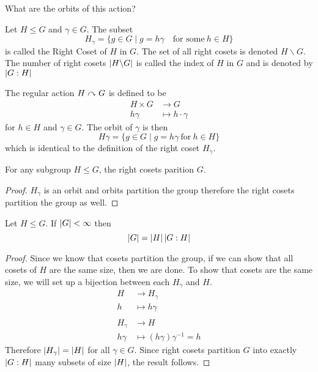 \documentclass{article}
\begin{document}
What are the orbits of this action?

\begin{defi}
    Let $H \leq G$ and $\gamma \in G$. The subset
    \[
        H_\gamma = \{g \in G \mid g = h \gamma \quad \text{for some} \ h \in H\}  
    \]
    is called the Right Coset of $H$ in $G$. 
    The set of all right cosets is denoted $H \backslash G$.
    The number of right cosets $\left\lvert H \backslash G\right\rvert$ is called the index of $H$ in $G$ and is denoted by $\left\lvert G : H\right\rvert$
\end{defi}

\begin{ex}
    The regular action $H \curvearrowright G$ is defined to be
    \begin{align*}
        H \times G &\rightarrow G \\
        h\gamma &\mapsto h \cdot \gamma 
    \end{align*}
    for $h \in H$ and $\gamma \in G$. The orbit of $\gamma$ is then
    \[
        H\gamma  = \{g \in G \mid g = h \gamma \ \text{for} \ h \in H\}
    \]
    which is identical to the definition of the right coset $H_\gamma$.
\end{ex}

\begin{lemma}
    For any subgroup $H \leq G$, the right cosets parition $G$.
\end{lemma}
\begin{proof}
    $H_\gamma$ is an orbit and orbits partition the group therefore the right cosets partition the group as well.
\end{proof}

\begin{thm}[Lagrange]
    Let $H \leq G$. If $\left\lvert G\right\rvert < \infty$ then
    \[
        \left\lvert G\right\rvert = \left\lvert H\right\rvert \left\lvert G : H\right\rvert  
    \]
\end{thm}

\begin{proof}
    Since we know that cosets partition the group, if we can show that all cosets of $H$ are the same size, then we are done.
    To show that cosets are the same size, we will set up a bijection between each $H_\gamma$ and $H$.
    \begin{align*}
        H &\rightarrow H_\gamma \tag{Fowrard Direction} \\
        h &\mapsto h \gamma \\
        \\
        H_\gamma &\rightarrow H \tag{Inverse Direction} \\
        h \gamma &\mapsto (h\gamma) \gamma^{-1} = h
    \end{align*}
    Therefore $\left\lvert H_\gamma\right\rvert = \left\lvert H\right\rvert$ for all $\gamma \in G$. Since right cosets partition $G$ into exactly $\left\lvert G : H\right\rvert$ many subsets of size $\left\lvert H\right\rvert$, the result follows.
\end{proof}
\end{document}
